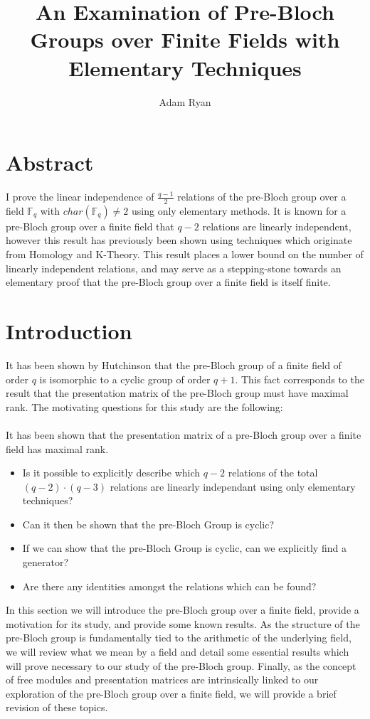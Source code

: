 \documentclass[11pt]{article}
\theoremstyle{plain}
\theoremstyle{definition}
\begin{document}
\title{An Examination of Pre-Bloch Groups over Finite Fields with Elementary Techniques}
\author{Adam Ryan}
\maketitle

\section{Abstract}\label{section:abstract}

I prove the linear independence of $\frac{q-1}{2}$ relations of the pre-Bloch group over a field $\mathbb{F}_q$ with $char(\mathbb{F}_q)  \neq 2$ using only elementary methods. It is known for a pre-Bloch group over a finite field that $q-2$ relations are  linearly independent, however this result has previously been shown using techniques which originate from Homology and K-Theory. This result places a lower bound on the number of linearly independent relations, and may serve as a stepping-stone towards an elementary proof that the pre-Bloch group over a finite field is itself finite.

\pagebreak
\tableofcontents
\pagebreak

\section{Introduction}\label{section:Preliminary}

It has been shown by Hutchinson \cite{1107.0264} that the pre-Bloch group of a finite field of order $q$ is isomorphic to a cyclic group of order $q+1$. This fact corresponds to the result that the presentation matrix of the pre-Bloch group must have maximal rank. The motivating questions for this study are the following:\\
\\
It has been shown that the presentation matrix of a pre-Bloch group over a finite field has maximal rank. 
	\begin{itemize}
		\item Is it possible to explicitly describe which $q-2$ relations of the total $(q-2)\cdot (q-3)$ relations  are linearly independant using only elementary techniques? 
		\item Can it then be shown that the pre-Bloch Group is cyclic?
		\item If we can show that the pre-Bloch Group is cyclic, can we explicitly find a generator?
		\item Are there any identities amongst the relations which can be found?
	\end{itemize}
In this section we will introduce the pre-Bloch group over a finite field, provide a motivation for its study, and provide some known results. As the structure of the pre-Bloch group is fundamentally tied to the arithmetic of the underlying field, we will review what we mean by a field and detail some essential results which will prove necessary to our study of the pre-Bloch group. Finally, as the concept of free modules and presentation matrices are intrinsically linked to our exploration of the pre-Bloch group over a finite field, we will provide a brief revision of these topics.
\pagebreak
\end{document}
